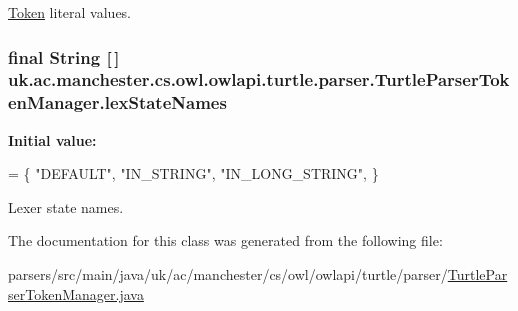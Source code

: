 \hyperlink{classuk_1_1ac_1_1manchester_1_1cs_1_1owl_1_1owlapi_1_1turtle_1_1parser_1_1_token}{Token} literal values. \hypertarget{classuk_1_1ac_1_1manchester_1_1cs_1_1owl_1_1owlapi_1_1turtle_1_1parser_1_1_turtle_parser_token_manager_a93d71ec11e23d26ceda8dc5c93fed052}{
\subsubsection[{lex\-State\-Names}]{\setlength{\rightskip}{0pt plus 5cm}final String \mbox{[}$\,$\mbox{]} uk.\-ac.\-manchester.\-cs.\-owl.\-owlapi.\-turtle.\-parser.\-Turtle\-Parser\-Token\-Manager.\-lex\-State\-Names\hspace{0.3cm}{\ttfamily [static]}}}\label{classuk_1_1ac_1_1manchester_1_1cs_1_1owl_1_1owlapi_1_1turtle_1_1parser_1_1_turtle_parser_token_manager_a93d71ec11e23d26ceda8dc5c93fed052}
{\bfseries Initial value\-:}
\begin{DoxyCode}
= \{
   \textcolor{stringliteral}{"DEFAULT"},
   \textcolor{stringliteral}{"IN\_STRING"},
   \textcolor{stringliteral}{"IN\_LONG\_STRING"},
\}
\end{DoxyCode}
Lexer state names. 

The documentation for this class was generated from the following file\-:\begin{DoxyCompactItemize}
\item 
parsers/src/main/java/uk/ac/manchester/cs/owl/owlapi/turtle/parser/\hyperlink{_turtle_parser_token_manager_8java}{Turtle\-Parser\-Token\-Manager.\-java}\end{DoxyCompactItemize}
